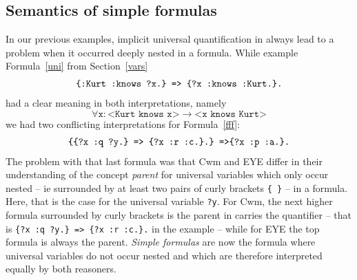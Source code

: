 \subsection{Semantics of simple formulas}
In our previous examples, implicit universal quantification in \nthree always lead to a problem when it occurred deeply nested in a formula. While example 
Formula~\ref{uni} from Section~\ref{vars}
\begin{multline}\notag
 \texttt{\{:Kurt :knows ?x.\} => }%
 \texttt{\{?x :knows :Kurt.\}.}%
\end{multline}
had a clear meaning in both interpretations, namely
\[
 \forall \texttt{x}: \texttt{<Kurt knows x>}\rightarrow \texttt{<x knows Kurt>}
\]
we had two conflicting interpretations for Formula~\ref{fff}:
\begin{multline}\notag
\texttt{\{\{?x :q ?y.\} => \{?x :r :c.\}.\} =>}
\texttt{\{?x :p :a.\}.}
\end{multline}
The problem with that last formula was that Cwm and EYE differ in their understanding of the concept \emph{parent}  
for universal variables which only occur nested -- ie surrounded by at least two pairs of curly brackets \texttt{\{~\}} -- in a formula.  Here, that is the case 
for the universal variable
\texttt{?y}. For Cwm, the next higher formula surrounded by curly brackets is the parent in carries the quantifier -- that is \texttt{\{?x :q ?y.\} => \{?x :r :c.\}.} in the example --
while for EYE the top formula is always the parent. \emph{Simple formulas} are now the formula where universal variables do not occur nested and which are therefore interpreted 
equally by both reasoners. 

